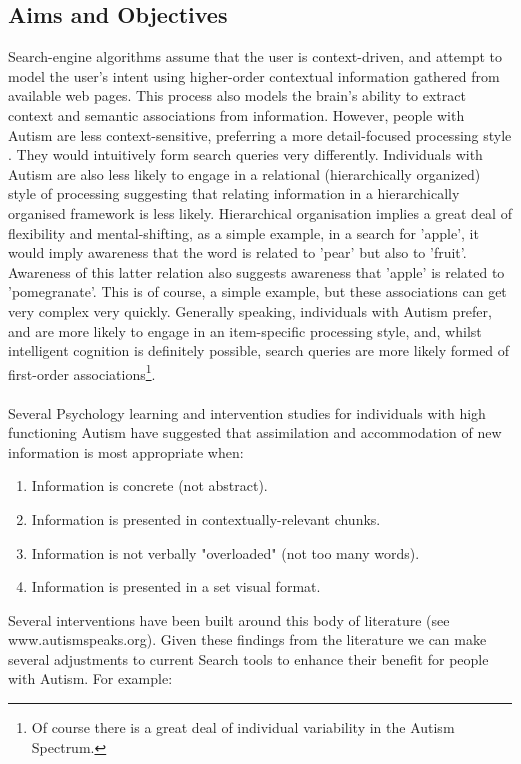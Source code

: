 \documentclass[10pt]{article}
\begin{document}
\subsection{Aims and Objectives}\label{the problem}
Search-engine algorithms assume that the user is context-driven, and attempt to model the user's intent using higher-order contextual information gathered from available web pages. This process also models the brain's ability to extract context and semantic associations from information. However, people with Autism are less context-sensitive, preferring a more detail-focused processing style \cite{mottron}. They would intuitively form search queries very differently. Individuals with Autism are also less likely to engage in a relational (hierarchically organized) style of processing \cite{bowler} suggesting that relating information in a hierarchically organised framework is less likely. Hierarchical organisation implies a great deal of flexibility and mental-shifting, as a simple example, in a search for 'apple', it would imply awareness that the word is related to 'pear' but also to 'fruit'. Awareness of this latter relation also suggests awareness that 'apple' is related to 'pomegranate'. This is of course, a simple example, but these associations can get very complex very quickly. Generally speaking, individuals with Autism prefer, and are more likely to engage in an item-specific processing style, and, whilst intelligent cognition is definitely possible, search queries are more likely formed of first-order associations\footnote{Of course there is a great deal of individual variability in the Autism Spectrum.}. \\
\\Several Psychology learning and intervention studies for individuals with high functioning Autism have suggested that assimilation and accommodation of new information is most appropriate when:\\
\begin{enumerate}
\item Information is concrete (not abstract).
\item Information is presented in contextually-relevant chunks.
\item Information is not verbally "overloaded" (not too many words).
\item Information is presented in a set visual format.
\end{enumerate}
Several interventions have been built around this body of literature (see www.autismspeaks.org).
Given these findings from the literature we can make several adjustments to current Search tools to enhance their benefit for people with Autism. For example:
\end{document}
